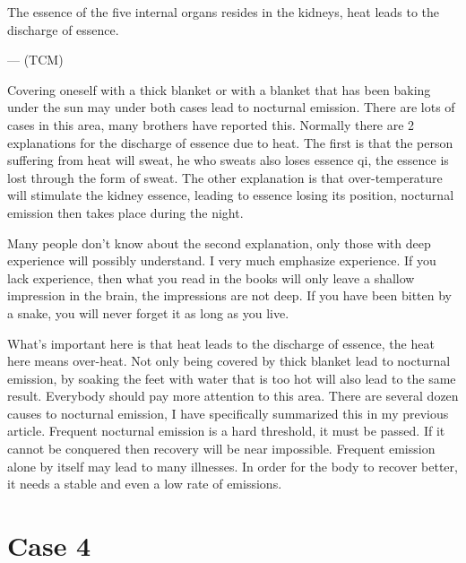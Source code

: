 \documentclass[
]{book}
\begin{document}
The essence of the five internal organs resides in the kidneys, heat leads to the discharge of essence.

--- (TCM)

Covering oneself with a thick blanket or with a blanket that has been baking under the sun may under both cases lead to nocturnal emission. There are lots of cases in this area, many brothers have reported this. Normally there are 2 explanations for the discharge of essence due to heat. The first is that the person suffering from heat will sweat, he who sweats also loses essence qi, the essence is lost through the form of sweat. The other explanation is that over-temperature will stimulate the kidney essence, leading to essence losing its position, nocturnal emission then takes place during the night.

Many people don't know about the second explanation, only those with deep experience will possibly understand. I very much emphasize experience. If you lack experience, then what you read in the books will only leave a shallow impression in the brain, the impressions are not deep. If you have been bitten by a snake, you will never forget it as long as you live.

What's important here is that heat leads to the discharge of essence, the heat here means over-heat. Not only being covered by thick blanket lead to nocturnal emission, by soaking the feet with water that is too hot will also lead to the same result. Everybody should pay more attention to this area. There are several dozen causes to nocturnal emission, I have specifically summarized this in my previous article. Frequent nocturnal emission is a hard threshold, it must be passed. If it cannot be conquered then recovery will be near impossible. Frequent emission alone by itself may lead to many illnesses. In order for the body to recover better, it needs a stable and even a low rate of emissions.

\hypertarget{case-4}{%
\section{Case 4}\label{case-4}}
\end{document}
